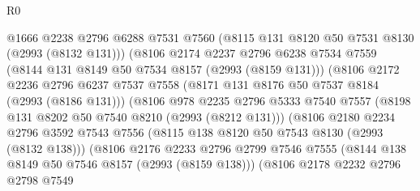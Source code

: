\begin{lexlean}{R0}
\begin{coremodule}
                                @1666
                                @2238
                                @2796
                                @6288
                                @7531
                                @7560
                                (@8115 @131 @8120 @50 @7531 @8130 (@2993 (@8132 @131)))
                                (@8106
                                  @2174
                                  @2237
                                  @2796
                                  @6238
                                  @7534
                                  @7559
                                  (@8144 @131 @8149 @50 @7534 @8157 (@2993 (@8159 @131)))
                                  (@8106
                                    @2172
                                    @2236
                                    @2796
                                    @6237
                                    @7537
                                    @7558
                                    (@8171 @131 @8176 @50 @7537 @8184 (@2993 (@8186 @131)))
                                    (@8106
                                      @978
                                      @2235
                                      @2796
                                      @5333
                                      @7540
                                      @7557
                                      (@8198 @131 @8202 @50 @7540 @8210 (@2993 (@8212 @131)))
                                      (@8106
                                        @2180
                                        @2234
                                        @2796
                                        @3592
                                        @7543
                                        @7556
                                        (@8115 @138 @8120 @50 @7543 @8130 (@2993 (@8132 @138)))
                                        (@8106
                                          @2176
                                          @2233
                                          @2796
                                          @2799
                                          @7546
                                          @7555
                                          (@8144 @138 @8149 @50 @7546 @8157 (@2993 (@8159 @138)))
                                          (@8106
                                            @2178
                                            @2232
                                            @2796
                                            @2798
                                            @7549

\end{coremodule}
\end{lexlean}
